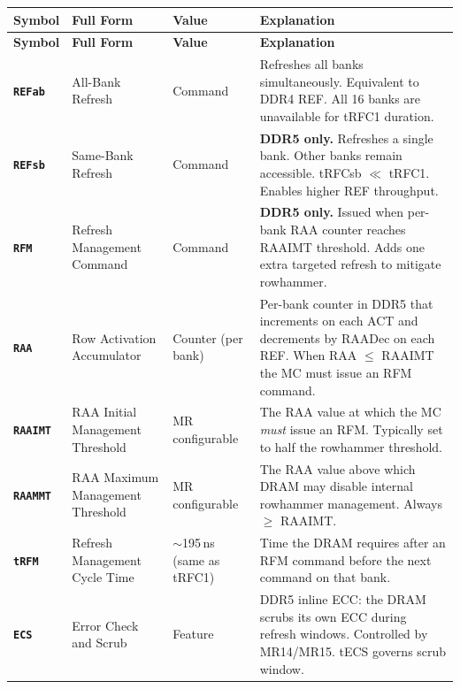 \documentclass[11pt,a4paper]{article}
\newcommand{\sym}[1]{\texttt{\textbf{#1}}}
\begin{document}
\begin{longtable}{L{2.2cm} L{4.8cm} L{3cm} L{5cm}}
\toprule
\textbf{Symbol} & \textbf{Full Form} & \textbf{Value} & \textbf{Explanation} \\
\midrule
\endfirsthead
\toprule
\textbf{Symbol} & \textbf{Full Form} & \textbf{Value} & \textbf{Explanation} \\
\midrule
\endhead
\bottomrule
\endfoot

\sym{REFab} & All-Bank Refresh & Command & Refreshes all banks simultaneously. 
  Equivalent to DDR4 REF. All 16 banks are unavailable for tRFC1 duration. \\

\sym{REFsb} & Same-Bank Refresh & Command & \textbf{DDR5 only.} Refreshes a single bank.
  Other banks remain accessible. tRFCsb $\ll$ tRFC1. Enables higher REF throughput. \\

\sym{RFM} & Refresh Management Command & Command & \textbf{DDR5 only.} Issued when per-bank RAA 
  counter reaches RAAIMT threshold. Adds one extra targeted refresh to mitigate rowhammer. \\

\sym{RAA} & Row Activation Accumulator & Counter (per bank) & Per-bank counter in DDR5 that 
  increments on each ACT and decrements by RAADec on each REF. 
  When RAA $\leq$ RAAIMT the MC must issue an RFM command. \\

\sym{RAAIMT} & RAA Initial Management Threshold & MR configurable & The RAA value at which 
  the MC \textit{must} issue an RFM. Typically set to half the rowhammer threshold. \\

\sym{RAAMMT} & RAA Maximum Management Threshold & MR configurable & The RAA value above which 
  DRAM may disable internal rowhammer management. Always $\geq$ RAAIMT. \\

\sym{tRFM} & Refresh Management Cycle Time & $\sim$195\,ns (same as tRFC1) & 
  Time the DRAM requires after an RFM command before the next command on that bank. \\

\sym{ECS} & Error Check and Scrub & Feature & DDR5 inline ECC: the DRAM scrubs its
  own ECC during refresh windows. Controlled by MR14/MR15. tECS governs scrub window. \\
\end{longtable}
\end{document}
